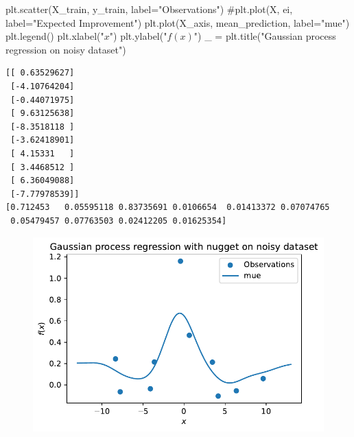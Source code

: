 \documentclass[
  letterpaper,
  DIV=11,
  numbers=noendperiod]{scrreprt}
\newenvironment{Shaded}{\begin{snugshade}}{\end{snugshade}}
\newcommand{\CommentTok}[1]{\textcolor[rgb]{0.37,0.37,0.37}{#1}}
\newcommand{\NormalTok}[1]{\textcolor[rgb]{0.00,0.23,0.31}{#1}}
\newcommand{\OperatorTok}[1]{\textcolor[rgb]{0.37,0.37,0.37}{#1}}
\newcommand{\StringTok}[1]{\textcolor[rgb]{0.13,0.47,0.30}{#1}}
\begin{document}
\begin{Shaded}
\begin{Highlighting}[]
\NormalTok{plt.scatter(X\_train, y\_train, label}\OperatorTok{=}\StringTok{"Observations"}\NormalTok{)}
\CommentTok{\#plt.plot(X, ei, label="Expected Improvement")}
\NormalTok{plt.plot(X\_axis, mean\_prediction, label}\OperatorTok{=}\StringTok{"mue"}\NormalTok{)}
\NormalTok{plt.legend()}
\NormalTok{plt.xlabel(}\StringTok{"$x$"}\NormalTok{)}
\NormalTok{plt.ylabel(}\StringTok{"$f(x)$"}\NormalTok{)}
\NormalTok{\_ }\OperatorTok{=}\NormalTok{ plt.title(}\StringTok{"Gaussian process regression on noisy dataset"}\NormalTok{)}
\end{Highlighting}
\end{Shaded}

\begin{verbatim}
[[ 0.63529627]
 [-4.10764204]
 [-0.44071975]
 [ 9.63125638]
 [-8.3518118 ]
 [-3.62418901]
 [ 4.15331   ]
 [ 3.4468512 ]
 [ 6.36049088]
 [-7.77978539]]
[0.712453   0.05595118 0.83735691 0.0106654  0.01413372 0.07074765
 0.05479457 0.07763503 0.02412205 0.01625354]
\end{verbatim}

\begin{figure}[H]

{\centering \includegraphics{012_num_spot_ei_files/figure-pdf/cell-56-output-2.pdf}

}

\end{figure}
\end{document}
